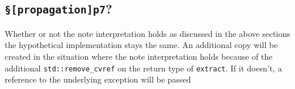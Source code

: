 \documentclass{article}
\begin{document}
\subsection{\texttt{§[propagation]p7}?}
Whether or not the note interpretation holds as discussed in the above
sections the hypothetical implementation stays the same.  An additional copy
will be created in the situation where the note interpretation holds because
of the additional \texttt{std::remove\_cvref} on the return type of
\texttt{extract}.  If it doesn't, a reference to the underlying exception will
be passed
\end{document}
